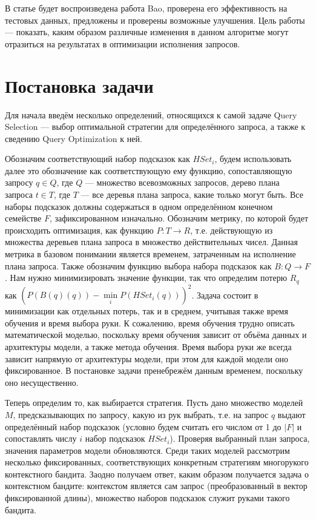 \documentclass[12pt]{article}
\begin{document}
В статье будет воспроизведена работа Bao, проверена его эффективность на тестовых данных, предложены и проверены возможные улучшения. Цель работы — показать, каким образом различные изменения в данном алгоритме могут отразиться на результатах в оптимизации исполнения запросов.

\section{Постановка задачи}

Для начала введём несколько определений, относящихся к самой задаче Query Selection — выбор оптимальной стратегии для определённого запроса, а также к сведению Query Optimization к ней.

Обозначим соответствующий набор подсказок как $HSet_i$, будем использовать далее это обозначение как соответствующую ему функцию, сопоставляющую запросу $q \in Q$, где $Q$ — множество всевозможных запросов, дерево плана запроса $t \in T$, где $T$ — все деревья плана запроса, какие только могут быть. Все наборы подсказок должны содержаться в одном определённом конечном семействе $F$, зафиксированном изначально. Обозначим метрику, по которой будет происходить оптимизация, как функцию $P : T \xrightarrow{} R$, т.е. действующую из множества деревьев плана запроса в множество действительных чисел. Данная метрика в базовом понимании является временем, затраченным на исполнение плана запроса. Также обозначим функцию выбора набора подсказок как $B: Q \xrightarrow{} F$. Нам нужно минимизировать значение функции, так что определим потерю $R_q$ как $(P(B(q)(q)) - \min\limits_{i} P(HSet_i(q)))^2$. Задача состоит в минимизации как отдельных потерь, так и в среднем, учитывая также время обучения и время выбора руки. К сожалению, время обучения трудно описать математической моделью, поскольку время обучения зависит от объёма данных и архитектуры модели, а также метода обучения. Время выбора руки же всегда зависит напрямую от архитектуры модели, при этом для каждой модели оно фиксированное. В постановке задачи пренебрежём данным временем, поскольку оно несущественно.

Теперь определим то, как выбирается стратегия. Пусть дано множество моделей $M$, предсказывающих по запросу, какую из рук выбрать, т.е. на запрос $q$ выдают определённый набор подсказок (условно будем считать его числом от 1 до $|F|$ и сопоставлять числу $i$ набор подсказок $HSet_i$). Проверяя выбранный план запроса, значения параметров модели обновляются. Среди таких моделей рассмотрим несколько фиксированных, соответствующих конкретным стратегиям многорукого контекстного бандита. Заодно получаем ответ, каким образом получается задача о контекстном бандите: контекстом является сам запрос (преобразованный в вектор фиксированной длины), множество наборов подсказок служит руками такого бандита.
\end{document}
